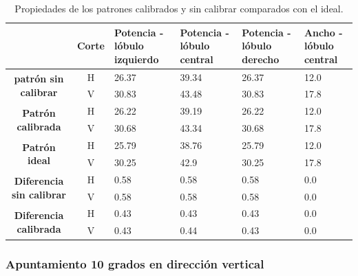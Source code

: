 \begin{table}[H]
  \footnotesize
  \centering
  \begin{tabular}{|c|c|p{2cm}|p{2cm}|p{2cm}|p{2cm}|}
    \cline{2-6}
    \multicolumn{1}{c|}{} & \textbf{Corte} & \textbf{Potencia - lóbulo izquierdo} & \textbf{Potencia - lóbulo central} &
    \textbf{Potencia - lóbulo derecho} & \textbf{Ancho - lóbulo central} \tabularnewline\hline
    \multirow{2}{*}{\textbf{patrón sin calibrar}} & H & 26.37 & 39.34 & 26.37 & 12.0 \tabularnewline\cline{2-6}
     & V & 30.83 & 43.48 & 30.83 & 17.8 \tabularnewline\hline
    \multirow{2}{*}{\textbf{Patrón calibrada}} & H & 26.22 & 39.19 & 26.22 & 12.0 \tabularnewline\cline{2-6}
     & V & 30.68 & 43.34 & 30.68 & 17.8 \tabularnewline\hline
    \multirow{2}{*}{\textbf{Patrón ideal}} & H & 25.79 & 38.76 & 25.79 & 12.0 \tabularnewline\cline{2-6}
     & V & 30.25 & 42.9 & 30.25 & 17.8 \tabularnewline\hline
    \multirow{2}{*}{\textbf{Diferencia sin calibrar}} & H & 0.58 & 0.58 & 0.58 & 0.0\tabularnewline\cline{2-6}
     & V & 0.58 & 0.58 & 0.58 & 0.0 \tabularnewline\hline
    \multirow{2}{*}{\textbf{Diferencia calibrada}} & H & 0.43 & 0.43 & 0.43 & 0.0 \tabularnewline\cline{2-6}
     & V & 0.43 & 0.44 & 0.43 & 0.0 \tabularnewline\hline
  \end{tabular}
  \caption{Propiedades de los patrones calibrados y sin calibrar comparados con el ideal.}
  \label{tab:nonErrClassical10degCol}
\end{table}


\subsubsection{Apuntamiento 10 grados en dirección vertical}

